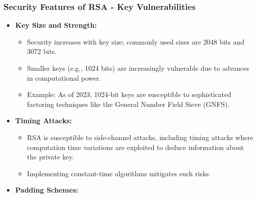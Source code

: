 \documentclass{beamer}
\begin{document}
\begin{frame}[fragile]
    \frametitle{Security Features of RSA - Key Vulnerabilities}
    \begin{itemize}
        \item \textbf{Key Size and Strength:}
        \begin{itemize}
            \item Security increases with key size; commonly used sizes are 2048 bits and 3072 bits.
            \item Smaller keys (e.g., 1024 bits) are increasingly vulnerable due to advances in computational power.
            \item Example: As of 2023, 1024-bit keys are susceptible to sophisticated factoring techniques like the General Number Field Sieve (GNFS).
        \end{itemize}
        \item \textbf{Timing Attacks:}
        \begin{itemize}
            \item RSA is susceptible to side-channel attacks, including timing attacks where computation time variations are exploited to deduce information about the private key.
            \item Implementing constant-time algorithms mitigates such risks.
        \end{itemize}
        \item \textbf{Padding Schemes:}
    \end{itemize}
\end{frame}
\end{document}
